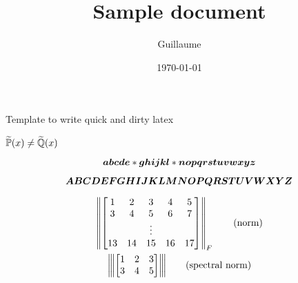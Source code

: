 \documentclass{article}
\title{Sample document}
\author{Guillaume}
\date{\today}
\begin{document}
\maketitle

Template to write quick and dirty latex

$\widetilde{\mathbb{P}}(x) \neq \widetilde{\mathbb{Q}}(x)$

\begin{equation}
\bm{a} \bm{b} \bm{c} \bm{d} \bm{e} * \bm{g} \bm{h} \bm{i} \bm{j} \bm{k} \bm{l} * \bm{n} \bm{o} \bm{p} \bm{q} \bm{r} \bm{s} \bm{t} \bm{u} \bm{v} \bm{w} \bm{x} \bm{y} \bm{z}
\end{equation}

\begin{equation}
\bm{A} \bm{B} \bm{C} \bm{D} \bm{E} \bm{F} \bm{G} \bm{H} \bm{I} \bm{J} \bm{K} \bm{L} \bm{M} \bm{N} \bm{O} \bm{P} \bm{Q} \bm{R} \bm{S} \bm{T} \bm{U} \bm{V} \bm{W} \bm{X} \bm{Y} \bm{Z}
\end{equation}


\begin{gather}
    \left\lVert 
    \begin{bmatrix}
        1 & 2 & 3 & 4 & 5 \\
        3 & 4 & 5 & 6 & 7 \\
        && \vdots && \\
        13 & 14 & 15 & 16 & 17 \\
    \end{bmatrix}
     \right\rVert_F \label{eq:norm} \tag{norm} \\
    {\left\vert\kern-0.25ex\left\vert\kern-0.25ex\left\vert 
    \begin{bmatrix}
        1 & 2 & 3 \\
        3 & 4 & 5
    \end{bmatrix}
     \right\vert\kern-0.25ex\right\vert\kern-0.25ex\right\vert} \label{eq:spnorm} \tag{spectral norm}
\end{gather}
\end{document}
